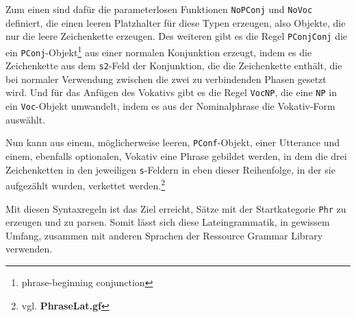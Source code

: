 Zum einen sind dafür die parameterlosen Funktionen \texttt{NoPConj} und \texttt{NoVoc} definiert, die einen leeren Platzhalter für diese Typen erzeugen, also Objekte, die nur die leere Zeichenkette erzeugen. Des weiteren gibt es die Regel \texttt{PConjConj} die ein \texttt{PConj}-Objekt\footnote{phrase-beginning conjunction} aus einer normalen Konjunktion erzeugt, indem es die Zeichenkette aus dem \texttt{s2}-Feld der Konjunktion, die die Zeichenkette enthält, die bei normaler Verwendung zwischen die zwei zu verbindenden Phasen gesetzt wird. Und für das Anfügen des Vokativs gibt es die Regel \texttt{VocNP}, die eine \texttt{NP} in ein \texttt{Voc}-Objekt umwandelt, indem es aus der Nominalphrase die Vokativ-Form auswählt. \par
Nun kann aus einem, möglicherweise leeren, \texttt{PConf}-Objekt, einer Utterance und einem, ebenfalls optionalen, Vokativ eine Phrase gebildet werden, in dem die drei Zeichenketten in den jeweiligen \texttt{s}-Feldern in eben dieser Reihenfolge, in der sie aufgezählt wurden, verkettet werden.\footnote{vgl. \textbf{PhraseLat.gf}} \par
Mit diesen Syntaxregeln ist das Ziel erreicht, Sätze mit der Startkategorie \texttt{Phr} zu erzeugen und zu parsen. Somit lässt sich diese Lateingrammatik, in gewissem Umfang, zusammen mit anderen Sprachen der Ressource Grammar Library verwenden.
